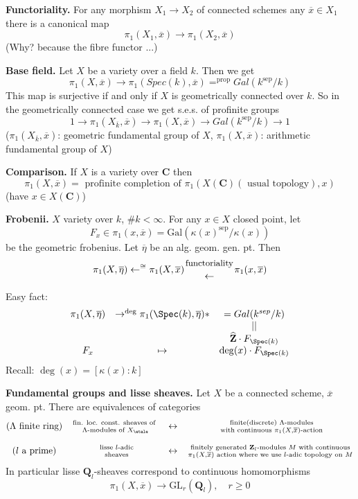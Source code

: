 \medskip\noindent
{\bf Functoriality.} For any morphism $X_1\to X_2$ of connected schemes
any $\overline x\in X_1$ there is a canonical map
$$
\pi_1(X_1, \overline x) \to \pi_1(X_2, \overline x)
$$
(Why? because the fibre functor ...)

\medskip\noindent
{\bf Base field.} Let $X$ be a variety over a field $k$. Then we get 	
$$
\pi_1(X, \overline x) \to
\pi_1(Spec(k), \overline x) =^{\text{prop}} Gal(k^{\text{sep}}/k)
$$
This map is surjective if and only if $X$ is geometrically connected over $k$.
So in the geometrically connected case we get s.e.s. of profinite
groups
$$
1 \to \pi_1(X_{\overline k}, \overline x) \to
\pi_1(X, \overline x) \to
Gal(k^{\text{sep}}/k) \to 1
$$
($\pi_1(X_{\overline k}, \overline x)$: geometric fundamental group of
$X$, $\pi_1(X, \overline x)$: arithmetic fundamental group of $X$)

\medskip\noindent
{\bf Comparison.} If $X$ is a variety over $\mathbf{C}$ then
$$
\pi_1(X, \overline x) =
\text{ profinite completion of }
\pi_1(X(\mathbf{C})(\text{ usual topology}), x)
$$
(have $x\in X(\mathbf{C})$)

\medskip\noindent
{\bf Frobenii.} $X$ variety over $k$, $\# k < \infty$. For any $x \in X$
closed point, let
$$
F_x\in \pi_1(x, \overline x) =
\text{Gal}(\kappa(x)^{\text{sep}}/\kappa(x))
$$
be the geometric frobenius.
Let $\overline\eta$ be an alg. geom. gen. pt. Then
$$
\pi_1(X, \overline\eta) \leftarrow^{\cong}
\pi_1(X, \overline x)
{\text{\small functoriality}\atop\leftarrow}
\pi_1(x, \overline x)
$$

\noindent
Easy fact:
$$
\begin{matrix}
\pi_1(X, \overline \eta) & \to^{\deg} \pi_1(\Spec(k), \overline \eta) * &
= Gal(k^{sep}/k) \\
& & || \\
& & \widehat{\mathbf{Z}}\cdot F_{\Spec(k)} \\
F_x & \mapsto & \deg(x)\cdot F_{\Spec(k)}
\end{matrix}
$$
Recall: $\deg(x) = [\kappa(x):k]$

\medskip\noindent
{\bf Fundamental groups and lisse sheaves.}
Let $X$ be a connected scheme, $\overline x$ geom. pt. There are
equivalences of categories
$$
\begin{matrix}
\text{($\Lambda$ finite ring)}& \text{fin. loc. const. sheaves
of }
\atop \Lambda\text{-modules of }X_\etale & \leftrightarrow &
\text{ finite(discrete) }\Lambda\text{-modules}\atop\text{ with continuous
}\pi_1(X, \overline x)\text{-action}\\
\\
(l\text{ a prime}) & \text{ lisse }l\text{-adic}\atop\text{
sheaves} & \leftrightarrow & \text{ finitely generated
}\mathbf{Z}_l\text{-modules } M \text{ with continuous }\atop \pi_1(X,
\overline x)\text{ action where we use $l$-adic topology on } M
\end{matrix}
$$
In particular lisse $\mathbf{Q}_l$-sheaves correspond to continuous
homomorphisms
$$
\pi_1(X, \overline x) \to \text{GL}_r(\mathbf{Q}_l), \quad r\geq 0
$$

